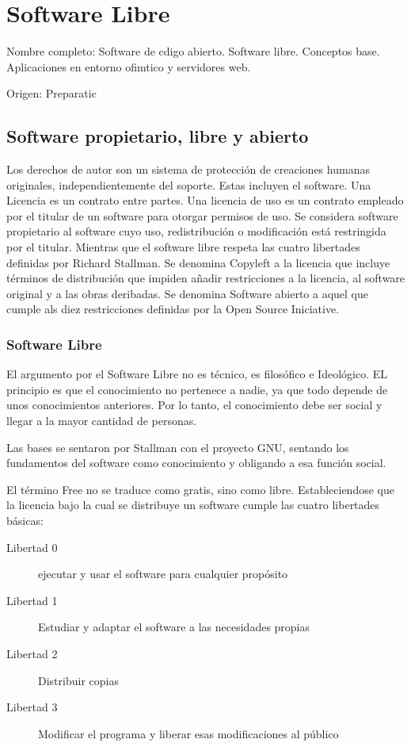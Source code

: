 \setcounter{section}{68}
\section{Software Libre}

Nombre completo: Software de cdigo abierto. Software libre. Conceptos base. Aplicaciones en entorno ofimtico y servidores web.

Origen: Preparatic

\localtableofcontents

\subsection{Software propietario, libre y abierto}
    Los derechos de autor son un sistema de protección de creaciones humanas originales, independientemente del soporte. Estas incluyen el software. Una Licencia es un contrato entre partes. Una licencia de uso es un contrato empleado por el titular de un software para otorgar permisos de uso. Se considera software propietario al software cuyo uso, redistribución o modificación está restringida por el titular. Mientras que el software libre respeta las cuatro libertades definidas por Richard Stallman. Se denomina Copyleft a la licencia que incluye términos de distribución que impiden añadir restricciones  a la licencia, al software original y a las obras deribadas. Se denomina Software abierto a aquel que cumple als diez restricciones definidas por la Open Source Iniciative.

    \subsubsection{Software Libre}
        El argumento por el Software Libre no es técnico, es filosófico e Ideológico. EL principio es que el conocimiento no pertenece a nadie, ya que todo depende de unos conocimientos anteriores. Por lo tanto, el conocimiento debe ser social y llegar a la mayor cantidad de personas.

        Las bases se sentaron por Stallman con el proyecto GNU, sentando los fundamentos del software como conocimiento y  obligando a esa función social.

        El término Free no se traduce como gratis, sino como libre. Estableciendose que la licencia bajo la cual se distribuye un software cumple las cuatro libertades básicas:
        \begin{description}
            \item[Libertad 0] ejecutar y usar el software para cualquier propósito
            \item[Libertad 1] Estudiar y adaptar el software a las necesidades propias
            \item[Libertad 2] Distribuir copias
            \item[Libertad 3] Modificar el programa y liberar esas modificaciones al público
        \end{description}

